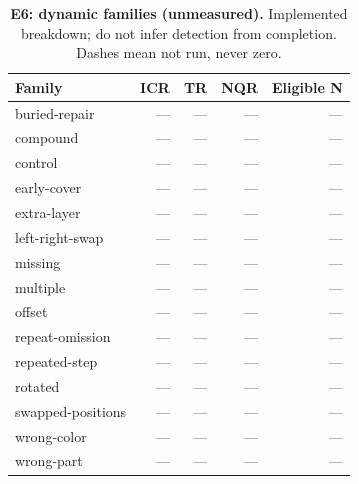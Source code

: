 \begin{table}[!ht]
\centering\small
\caption{\textbf{E6: dynamic families (unmeasured).} Implemented breakdown; do not infer detection from completion. Dashes mean not run, never zero.}
\begin{tabularx}{\textwidth}{@{}Xrrrr@{}}\toprule
Family & ICR & TR & NQR & Eligible N\\\midrule
buried-repair & --- & --- & --- & ---\\
compound & --- & --- & --- & ---\\
control & --- & --- & --- & ---\\
early-cover & --- & --- & --- & ---\\
extra-layer & --- & --- & --- & ---\\
left-right-swap & --- & --- & --- & ---\\
missing & --- & --- & --- & ---\\
multiple & --- & --- & --- & ---\\
offset & --- & --- & --- & ---\\
repeat-omission & --- & --- & --- & ---\\
repeated-step & --- & --- & --- & ---\\
rotated & --- & --- & --- & ---\\
swapped-positions & --- & --- & --- & ---\\
wrong-color & --- & --- & --- & ---\\
wrong-part & --- & --- & --- & ---\\
\bottomrule
\end{tabularx}
\end{table}
